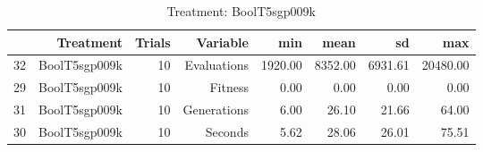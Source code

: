 \begin{table}[ht]
\centering
\begin{tabular}{rrrrrrrr}
  \hline
 & Treatment & Trials & Variable & min & mean & sd & max \\ 
  \hline
32 & BoolT5sgp009k &  10 & Evaluations & 1920.00 & 8352.00 & 6931.61 & 20480.00 \\ 
  29 & BoolT5sgp009k &  10 & Fitness & 0.00 & 0.00 & 0.00 & 0.00 \\ 
  31 & BoolT5sgp009k &  10 & Generations & 6.00 & 26.10 & 21.66 & 64.00 \\ 
  30 & BoolT5sgp009k &  10 & Seconds & 5.62 & 28.06 & 26.01 & 75.51 \\ 
   \hline
\end{tabular}
\caption{Treatment: BoolT5sgp009k} 
\end{table}
